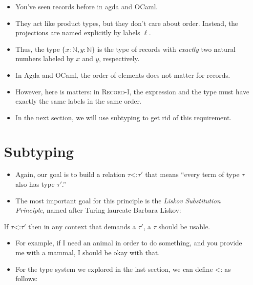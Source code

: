 \documentclass{lecturenotes}
\newcommand{\subtype}{\ensuremath{\mathrel{\mathord{<}\mathord{:}}}}
\begin{document}
\begin{itemize}
\item You've seen records before in agda and OCaml.
\item They act like product types, but they don't care about order.
  Instead, the projections are named explicitly by labels $\ell$.
\item Thus, the type $\{x : \mathbb{N}, y : \mathbb{N}\}$ is the type of records with \emph{exactly} two natural numbers labeled by $x$ and $y$, respectively.
\item In Agda and OCaml, the order of elements does not matter for records.
\item However, here is matters: in \textsc{Record-I}, the expression and the type must have exactly the same labels in the same order.
\item In the next section, we will use subtyping to get rid of this requirement.
\end{itemize}

\section{Subtyping}
\label{sec:subtyping}

\begin{itemize}
\item Again, our goal is to build a relation $\tau \subtype \tau'$ that means ``every term of type $\tau$ also has type $\tau'$.''
\item The most important goal for this principle is the \emph{Liskov Substitution Principle}, named after Turing laureate Barbara Liskov:
\end{itemize}

\begin{defn}
  If $\tau \subtype \tau'$ then in any context that demands a $\tau'$, a $\tau$ should be usable.
\end{defn}

\begin{itemize}
\item For example, if I need an animal in order to do something, and you provide me with a mammal, I should be okay with that.
\item For the type system we explored in the last section, we can define $\subtype$ as follows:
\end{itemize}
\end{document}
